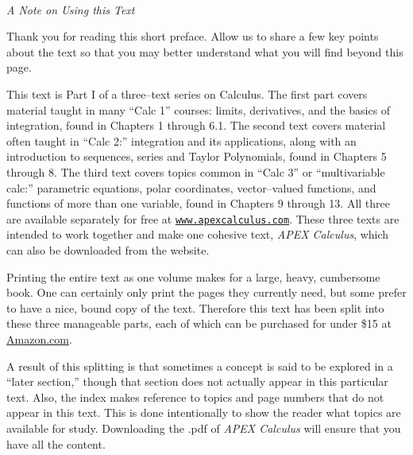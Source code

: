 \newpage

\Huge
{}\\
\large
\emph{A Note on Using this Text}
\baselineskip
\normalsize

Thank you for reading this short preface. Allow us to share a few key points about the text so that you may better understand what you will find beyond this page.

This text is Part I of a three--text series on Calculus. The first part covers material taught in many ``Calc 1'' courses: limits, derivatives, and the basics of integration, found in Chapters 1 through 6.1. The second text covers material often taught in ``Calc 2:'' integration and its applications, along with an introduction to sequences, series and Taylor Polynomials, found in Chapters 5 through 8. The third text covers topics common in ``Calc 3'' or ``multivariable calc:'' parametric equations, polar coordinates, vector--valued functions, and functions of more than one variable, found in Chapters 9 through 13. All three are available separately for free at \texttt{\href{http://apexcalculus.com}{www.apexcalculus.com}}. These three texts are intended to work together and make one cohesive text, \textit{APEX Calculus}, which can also be downloaded from the website. 

Printing the entire text as one volume makes for a large, heavy, cumbersome book. One can certainly only print the pages they currently need, but some prefer to have a nice, bound copy of the text. Therefore this text has been split into these three manageable parts, each of which can be purchased for under \$15 at \href{http://amazon.com}{Amazon.com}. 

A result of this splitting is that sometimes a concept is said to be explored in a ``later section,'' though that section does not actually appear in this particular text. Also, the index makes reference to topics and page numbers that do not appear in this text. This is done intentionally to show the reader what topics are available for study.  Downloading the .pdf of \textit{APEX Calculus} will ensure that you have all the content.\\ 

